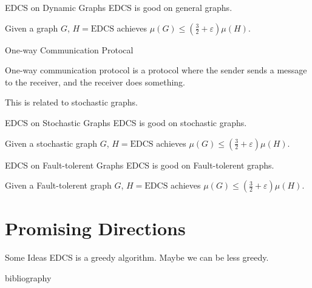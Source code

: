 \documentclass{beamer}
\newcommand{\EDCS}{\text{EDCS}}
\begin{document}
\begin{frame}{EDCS on Dynamic Graphs}
    EDCS is good on general graphs.
    \begin{lemma}
        Given a graph $G$, $H=\EDCS$ achieves $\mu(G)\leq\left( \frac{3}{2}+\varepsilon \right)\mu(H)$.
    \end{lemma}
\end{frame}

\begin{frame}{One-way Communication Protocal}
    \begin{definition}
        One-way communication protocol is a protocol where the sender sends a message to the receiver, 
        and the receiver does something.
    \end{definition}
    This is related to stochastic graphs.
\end{frame}

\begin{frame}{EDCS on Stochastic Graphs}
    EDCS is good on stochastic graphs.
    \begin{lemma}
        Given a stochastic graph $G$, $H=\EDCS$ achieves $\mu(G)\leq\left( \frac{3}{2}+\varepsilon \right)\mu(H)$.
    \end{lemma}
\end{frame}

\begin{frame}{EDCS on Fault-tolerent Graphs}
    EDCS is good on Fault-tolerent graphs.
    \begin{lemma}
        Given a Fault-tolerent graph $G$, $H=\EDCS$ achieves $\mu(G)\leq\left( \frac{3}{2}+\varepsilon \right)\mu(H)$.
    \end{lemma}
\end{frame}

\section{Promising Directions}
\begin{frame}{Some Ideas}
    EDCS is a greedy algorithm. Maybe we can be less greedy.
\end{frame} 

\begin{frame}{bibliography}
    \printbibliography
\end{frame}
\end{document}
